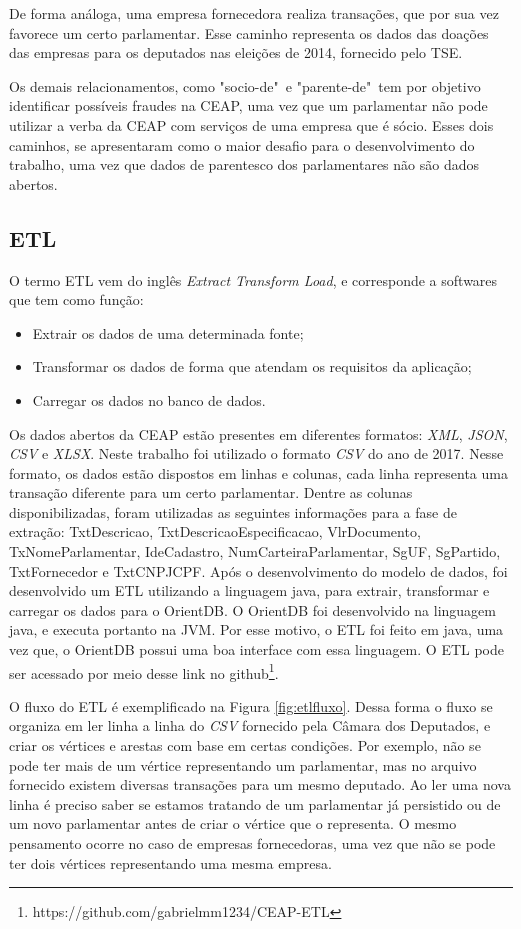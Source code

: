 De forma análoga, uma empresa fornecedora realiza transações, que por sua vez favorece um certo parlamentar. Esse caminho representa os dados das doações das empresas para os deputados nas eleições de 2014, fornecido pelo TSE. 

Os demais relacionamentos, como "socio-de"\ e "parente-de"\ tem por objetivo identificar possíveis fraudes na CEAP, uma vez que um parlamentar não pode utilizar a verba da CEAP com serviços de uma empresa que é sócio. Esses dois caminhos, se apresentaram como o maior desafio para o desenvolvimento do trabalho, uma vez que dados de parentesco dos parlamentares não são dados abertos.

\subsection{ETL} \label{etl-subsection}

	O termo ETL vem do inglês \textit{Extract Transform Load}, e corresponde a softwares que tem como função:
\begin{itemize}
		\item Extrair os dados de uma determinada fonte;
		\item Transformar os dados de forma que atendam os requisitos da aplicação;
		\item Carregar os dados no banco de dados.
\end{itemize}
	
	Os dados abertos da CEAP estão presentes em diferentes formatos: \textit{XML}, \textit{JSON}, \textit{CSV} e \textit{XLSX}. Neste trabalho foi utilizado o formato \textit{CSV} do ano de 2017. Nesse formato, os dados estão dispostos em linhas e colunas, cada linha representa uma transação diferente para um certo parlamentar. Dentre as colunas disponibilizadas, foram utilizadas as seguintes informações para a fase de extração: TxtDescricao, TxtDescricaoEspecificacao, VlrDocumento, TxNomeParlamentar, IdeCadastro, NumCarteiraParlamentar, SgUF, SgPartido, TxtFornecedor e TxtCNPJCPF. Após o desenvolvimento do modelo de dados, foi desenvolvido um ETL utilizando a linguagem java, para extrair, transformar e carregar os dados para o OrientDB. O OrientDB foi desenvolvido na linguagem java, e executa portanto na JVM. Por esse motivo, o ETL foi feito em java, uma vez que, o OrientDB possui uma boa interface com essa linguagem. O ETL pode ser acessado por meio desse link no github\footnote{https://github.com/gabrielmm1234/CEAP-ETL}.
	
	O fluxo do ETL é exemplificado na Figura \ref{fig:etlfluxo}. Dessa forma o fluxo se organiza em ler linha a linha do \textit{CSV} fornecido pela Câmara dos Deputados, e criar os vértices e arestas com base em certas condições. Por exemplo, não se pode ter mais de um vértice representando um parlamentar, mas no arquivo fornecido existem diversas transações para um mesmo deputado. Ao ler uma nova linha é preciso saber se estamos tratando de um parlamentar já persistido ou de um novo parlamentar antes de criar o vértice que o representa. O mesmo pensamento ocorre no caso de empresas fornecedoras, uma vez que não se pode ter dois vértices representando uma mesma empresa.
	
